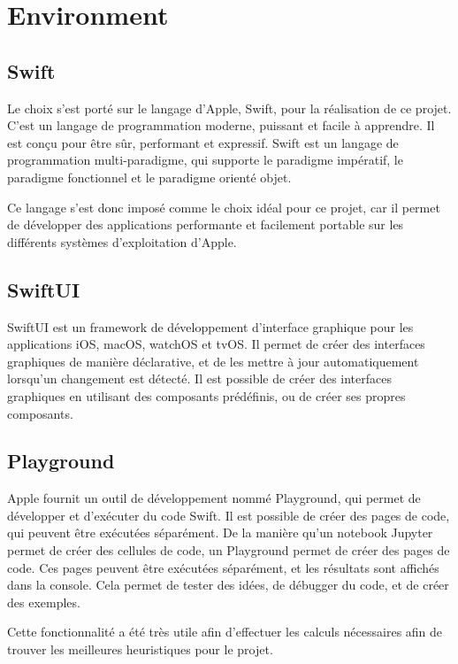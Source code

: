 \chapter{Environment}

\section{Swift}
Le choix s'est porté sur le langage d'Apple, Swift, pour la réalisation de ce projet. C'est un langage de programmation moderne, puissant et facile à apprendre. Il est conçu pour être sûr, performant et expressif. Swift est un langage de programmation multi-paradigme, qui supporte le paradigme impératif, le paradigme fonctionnel et le paradigme orienté objet.

Ce langage s'est donc imposé comme le choix idéal pour ce projet, car il permet de développer des applications performante et facilement portable sur les différents systèmes d'exploitation d'Apple.

\section{SwiftUI}
SwiftUI est un framework de développement d'interface graphique pour les applications iOS, macOS, watchOS et tvOS. Il permet de créer des interfaces graphiques de manière déclarative, et de les mettre à jour automatiquement lorsqu'un changement est détecté. Il est possible de créer des interfaces graphiques en utilisant des composants prédéfinis, ou de créer ses propres composants.

\section{Playground}
Apple fournit un outil de développement nommé Playground, qui permet de développer et d'exécuter du code Swift. Il est possible de créer des pages de code, qui peuvent être exécutées séparément. De la manière qu'un notebook Jupyter permet de créer des cellules de code, un Playground permet de créer des pages de code. Ces pages peuvent être exécutées séparément, et les résultats sont affichés dans la console. Cela permet de tester des idées, de débugger du code, et de créer des exemples.

Cette fonctionnalité a été très utile afin d'effectuer les calculs nécessaires afin de trouver les meilleures heuristiques pour le projet.

